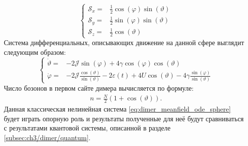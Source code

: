 \begin{equation}
	\label{eq:dimer_meanfield_sphere}
	\left\{
	\begin{array}{rl}
		\mathscr{S}_x = & \frac{1}{2} \cos{\left(\varphi\right)}\sin{\left(\vartheta\right)}\\
		\mathscr{S}_y = & \frac{1}{2} \sin{\left(\varphi\right)}\sin{\left(\vartheta\right)}\\
		\mathscr{S}_z = & \frac{1}{2} \cos{\left(\vartheta\right)}
	\end{array}
	\right.
\end{equation}
Система дифференциальных, описывающих движение на данной сфере выглядит следующим образом:
\begin{equation}
	\label{eq:dimer_meanfield_ode_sphere}
	\left\{
	\begin{array}{rl}
		\dot{\vartheta} = & -2\mathcal{J}\sin{\left(\varphi\right)} + 4\gamma \cos{\left(\varphi\right)}\cos{\left(\vartheta\right)} \\
		\dot{\varphi} = & -2 \mathcal{J} \frac{\cos{\left(\vartheta\right)}}{\sin{\left(\vartheta\right)}} - 2\varepsilon\left(t\right) + 4U \cos{\left(\vartheta\right)} - 4\gamma\frac{\sin{\left(\varphi\right)}}{\sin{\left(\vartheta\right)}}
	\end{array}
	\right.
\end{equation}
Число бозонов в первом сайте димера вычисляется по формуле:
\begin{equation}
	\label{eq:dimer_meanfield_num_bosons}
	\begin{gathered}
		n=\frac{N}{2}(1+\cos{\left(\vartheta\right)}).
	\end{gathered}
\end{equation}
Данная классическая нелинейная система \cref{eq:dimer_meanfield_ode_sphere} будет играть опорную роль и результаты полученные для неё будут сравниваться с результатами квантовой системы, описанной в разделе \cref{subsec:ch3/dimer/quantum}.



